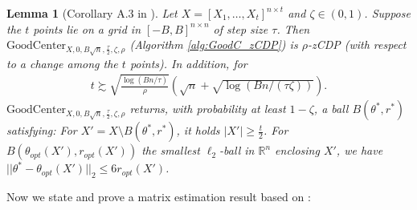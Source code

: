 \documentclass{article}
\newtheorem{lemma}{Lemma}
\begin{document}
\begin{lemma}[Corollary A.3 in \cite{mahpud2022differentially}]
\label{lemma:cor_a3_supp} 
Let $X = [X_1, \dots, X_t]^{n \times t}$ and $\zeta \in (0, 1)$. Suppose the $t$ points lie on a grid in $[-B, B]^{n \times n}$ of step size $\tau$. Then $\mathrm{GoodCenter}_{X, 0, B\sqrt{n}, \frac{\tau}{2}, \zeta, \rho}$ (Algorithm \ref{alg:GoodC_zCDP}) is $\rho$-zCDP (with respect to a change among the $t$ points). In addition, for
\begin{align*}
t \succsim \sqrt{\frac{\log(Bn/\tau)}{\rho}}\left(\sqrt{n} + \sqrt{\log(Bn/(\tau\zeta))}\right).    
\end{align*}
$\mathrm{GoodCenter}_{X, 0, B\sqrt{n}, \frac{\tau}{2}, \zeta, \rho}$ returns, with probability at least $1 - \zeta$, a ball $B(\theta^*, r^*)$ satisfying: For $X' = X \setminus B(\theta^*, r^*)$, it holds $|X'| \geq \frac{t}{2}$. For $B(\theta_{opt}(X'), r_{opt}(X'))$ the smallest $\ell_2$-ball in $\mathbb{R}^n$ enclosing $X'$, we have $||\theta^* - \theta_{opt}(X')||_2 \leq 6r_{opt}(X')$.  
\end{lemma}

Now we state and prove a matrix estimation result based on \cite{hardt2014noisy}:
\end{document}
